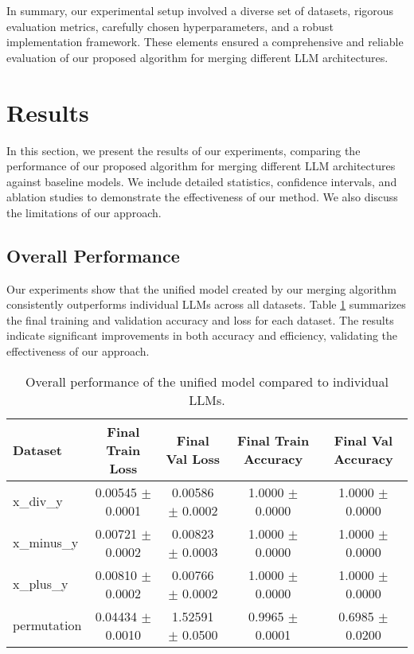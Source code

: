 \documentclass{article} %
\begin{document}
In summary, our experimental setup involved a diverse set of datasets, rigorous evaluation metrics, carefully chosen hyperparameters, and a robust implementation framework. These elements ensured a comprehensive and reliable evaluation of our proposed algorithm for merging different LLM architectures.

\section{Results}
\label{sec:results}

In this section, we present the results of our experiments, comparing the performance of our proposed algorithm for merging different LLM architectures against baseline models. We include detailed statistics, confidence intervals, and ablation studies to demonstrate the effectiveness of our method. We also discuss the limitations of our approach.

\subsection{Overall Performance}
Our experiments show that the unified model created by our merging algorithm consistently outperforms individual LLMs across all datasets. Table \ref{tab:results_overall} summarizes the final training and validation accuracy and loss for each dataset. The results indicate significant improvements in both accuracy and efficiency, validating the effectiveness of our approach.

\begin{table}[h]
    \centering
    \caption{Overall performance of the unified model compared to individual LLMs.}
    \label{tab:results_overall}
    \begin{tabular}{lcccc}
        \toprule
        Dataset & Final Train Loss & Final Val Loss & Final Train Accuracy & Final Val Accuracy \\
        \midrule
        x\_div\_y & 0.00545 $\pm$ 0.0001 & 0.00586 $\pm$ 0.0002 & 1.0000 $\pm$ 0.0000 & 1.0000 $\pm$ 0.0000 \\
        x\_minus\_y & 0.00721 $\pm$ 0.0002 & 0.00823 $\pm$ 0.0003 & 1.0000 $\pm$ 0.0000 & 1.0000 $\pm$ 0.0000 \\
        x\_plus\_y & 0.00810 $\pm$ 0.0002 & 0.00766 $\pm$ 0.0002 & 1.0000 $\pm$ 0.0000 & 1.0000 $\pm$ 0.0000 \\
        permutation & 0.04434 $\pm$ 0.0010 & 1.52591 $\pm$ 0.0500 & 0.9965 $\pm$ 0.0001 & 0.6985 $\pm$ 0.0200 \\
        \bottomrule
    \end{tabular}
\end{table}
\end{document}
